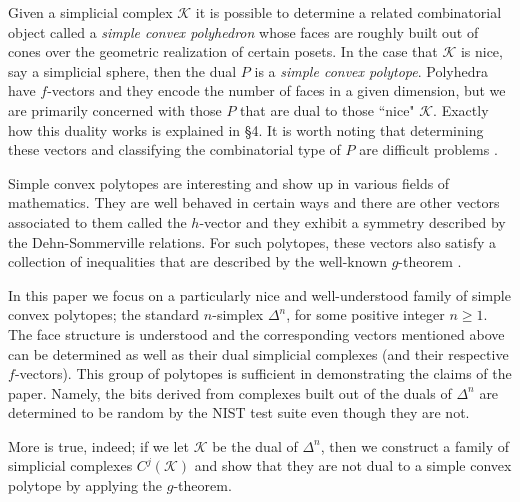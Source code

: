 \documentclass[oneside,12pt]{amsart}
\theoremstyle{definition}
\numberwithin{equation}{section}
\begin{document}
Given a simplicial complex $\mathcal{K}$ it is possible to determine a related combinatorial object called a \textit{simple convex polyhedron} whose faces are roughly built out of cones over the geometric realization of certain posets.  In the case that $\mathcal{K}$ is nice, say a simplicial sphere, then the dual $P$ is a \textit{simple convex polytope}.  Polyhedra have $f$-vectors and they encode the number of faces in a given dimension, but we are primarily concerned with those $P$ that are dual to those ``nice" $\mathcal{K}$.  Exactly how this duality works is explained in \S 4.  It is worth noting that determining these vectors and classifying the combinatorial type of $P$ are difficult problems  \cite{KP}.

Simple convex polytopes are interesting and show up in various fields of mathematics. They are well behaved in certain ways and there are other vectors associated to them called the $h$-vector and they exhibit a symmetry described by the Dehn-Sommerville relations.  For such polytopes, these vectors also satisfy a collection of inequalities that are described by the well-known $g$-theorem \cite{B,BP1}.

In this paper we focus on a particularly nice and well-understood family of simple convex polytopes; the standard $n$-simplex $\Delta^n$, for some positive integer $n \geq 1$.  The face structure is understood and the corresponding vectors mentioned above can be determined as well as their dual simplicial complexes (and their respective $f$-vectors).  This group of polytopes is sufficient in demonstrating the claims of the paper.  Namely, the bits derived from complexes built out of the duals of $\Delta^n$ are determined to be random by the NIST test suite even though they are not.


More is true, indeed; if we let $\mathcal{K}$ be the dual of $\Delta^n$, then we construct a family of simplicial complexes $C^j(\mathcal{K})$ and show that they are not dual to a simple convex polytope by applying the $g$-theorem.

\end{document}
